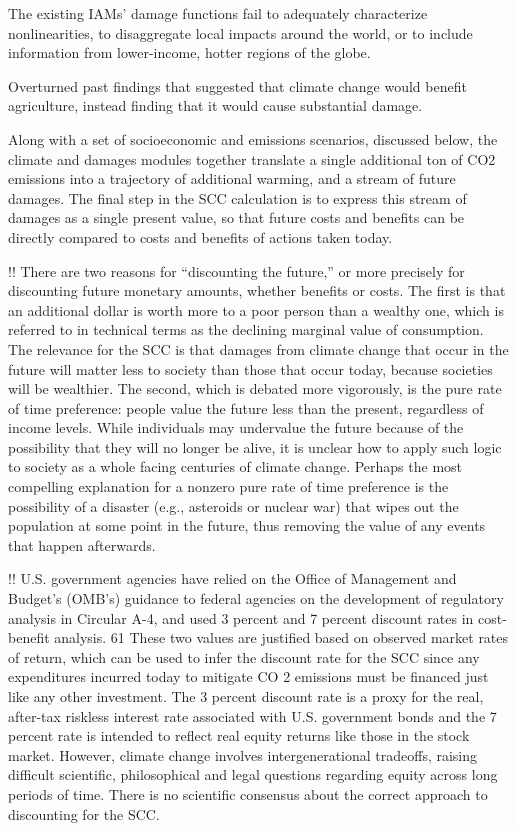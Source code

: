 \documentclass[
]{book}
\begin{document}
The existing IAMs' damage functions fail to adequately characterize
nonlinearities, to disaggregate local impacts around the world, or to include
information from lower-income, hotter regions of the globe.

Overturned past findings that suggested that
climate change would benefit agriculture, instead finding that it would cause substantial
damage.

Along with a set of socioeconomic and emissions scenarios, discussed below,
the climate and damages modules together translate a single additional ton of CO2
emissions into a trajectory of additional warming, and a stream of future damages. The
final step in the SCC calculation is to express this stream of damages as a single present
value, so that future costs and benefits can be directly compared to costs and benefits of
actions taken today.

!!
There are two reasons for ``discounting the future,'' or more precisely for discounting
future monetary amounts, whether benefits or costs. The first is that an additional
dollar is worth more to a poor person than a wealthy one, which is referred to in
technical terms as the declining marginal value of consumption. The relevance for the
SCC is that damages from climate change that occur in the future will matter less to
society than those that occur today, because societies will be wealthier. The second,
which is debated more vigorously, is the pure rate of time preference: people value the
future less than the present, regardless of income levels. While individuals may
undervalue the future because of the possibility that they will no longer be alive, it is
unclear how to apply such logic to society as a whole facing centuries of climate change.
Perhaps the most compelling explanation for a nonzero pure rate of time preference is
the possibility of a disaster (e.g., asteroids or nuclear war) that wipes out the population
at some point in the future, thus removing the value of any events that happen
afterwards.

!!
U.S. government agencies have relied on the Office of Management and
Budget's (OMB's) guidance to federal agencies on the development of regulatory
analysis in Circular A-4, and used 3 percent and 7 percent discount rates in cost-benefit
analysis. 61 These two values are justified based on observed market rates of return,
which can be used to infer the discount rate for the SCC since any expenditures
incurred today to mitigate CO 2 emissions must be financed just like any other
investment. The 3 percent discount rate is a proxy for the real, after-tax riskless interest
rate associated with U.S. government bonds and the 7 percent rate is intended to reflect
real equity returns like those in the stock market. However, climate change involves
intergenerational tradeoffs, raising difficult scientific, philosophical and legal questions
regarding equity across long periods of time. There is no scientific consensus about the
correct approach to discounting for the SCC.
\end{document}
